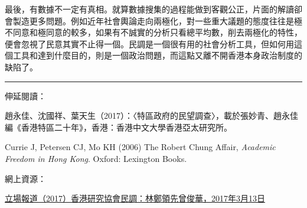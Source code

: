 最後，有數據不一定有真相。就算數據搜集的過程能做到客觀公正，片面的解讀卻會製造更多問題。例如近年社會輿論走向兩極化，對一些重大議題的態度往往是極不同意和極同意的較多，如果有不誠實的分析只看總平均數，削去兩極化的特性，便會忽視了民意其實不止得一個。民調是一個很有用的社會分析工具，但如何用這個工具和達到什麼目的，則是一個政治問題，而這點又離不開香港本身政治制度的缺陷了。

\rule[-10pt]{15cm}{0.05em}

伸延閱讀：

趙永佳、沈國祥、葉天生（2017）：〈特區政府的民望調查〉，載於張妙青、趙永佳編《香港特區二十年》，香港：香港中文大學香港亞太研究所。

Currie J, Petersen CJ, Mo KH (2006) The Robert Chung Affair, \textit{Academic Freedom in Hong Kong}. Oxford: Lexington Books.

網上資源：

\href{https://thestandnews.com/politics/平行時空-香港研究協會民調-林鄭領先曾俊華/}{立場報道（2017）香港研究協會民調：林鄭領先曾俊華，2017年3月13日}